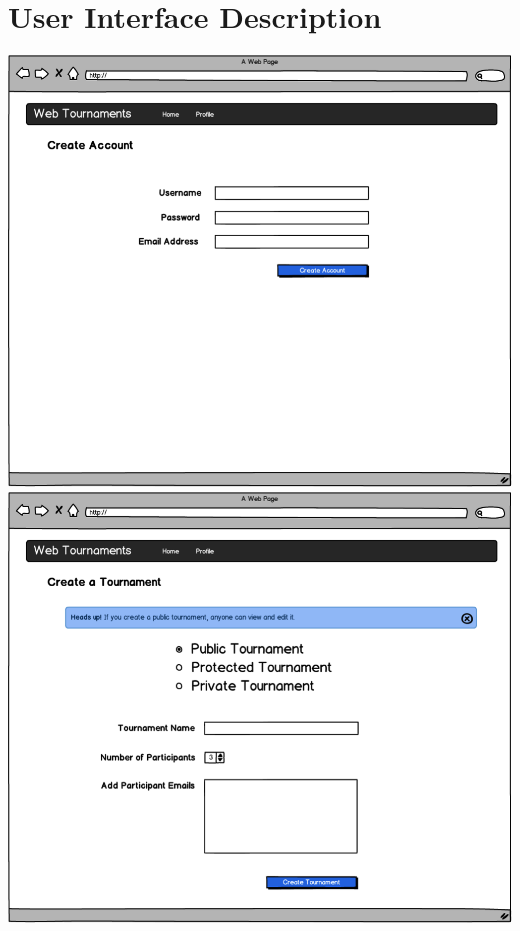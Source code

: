 \documentclass{article}
\begin{document}
\newpage
\section{User Interface Description}
\includegraphics[width=1\textwidth]{one}
\newpage
\includegraphics[width=1\textwidth]{two}
\newpage
\end{document}
